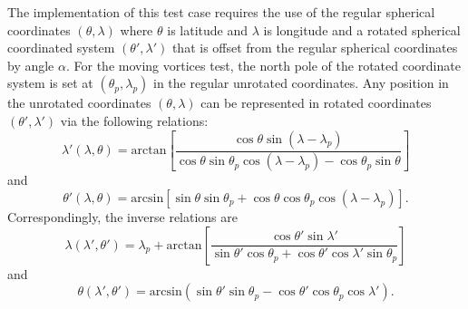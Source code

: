 The implementation of this test case requires the use of the regular spherical
coordinates $(\theta,\lambda)$ where $\theta$ is latitude and $\lambda$ is longitude
and a rotated spherical coordinated system $(\theta', \lambda')$ that is offset from the regular  
spherical coordinates by angle $\alpha$. For the moving vortices test, the north pole
of the rotated coordinate system is set at $(\theta_p, \lambda_p)$ in
the regular unrotated coordinates. Any position in the unrotated coordinates $(\theta, \lambda)$
can be represented in rotated coordinates $(\theta', \lambda')$ via the following relations:
\begin{equation}
   \label{eq:rotlam} \lambda'(\lambda,\theta) = \mathrm{arctan}\left[\frac{\cos\theta\sin\left(\lambda-\lambda_p\right)}
       {\cos\theta\sin\theta_p \cos\left(\lambda - \lambda_p\right) - \cos\theta_p \sin\theta}\right]
\end{equation}
and
\begin{equation}
   \label{eq:rotlthet} \theta'(\lambda,\theta) = \mathrm{arcsin}\left[\sin\theta \sin\theta_p + 
       \cos\theta \cos\theta_p \cos\left(\lambda - \lambda_p\right) \right].
\end{equation}
Correspondingly, the inverse relations are
\begin{equation}
   \label{eq:unrotlam} \lambda(\lambda',\theta') = \lambda_p + \mathrm{arctan}\left[\frac{\cos\theta'\sin\lambda'}
       {\sin\theta' \cos\theta_p + \cos\theta' \cos\lambda' \sin\theta_p}\right]
\end{equation}
and
\begin{equation}
   \label{eq:unrotlthet} \theta(\lambda',\theta') = \mathrm{arcsin}\left(\sin\theta' \sin\theta_p - 
       \cos\theta' \cos\theta_p \cos\lambda' \right).
\end{equation}

